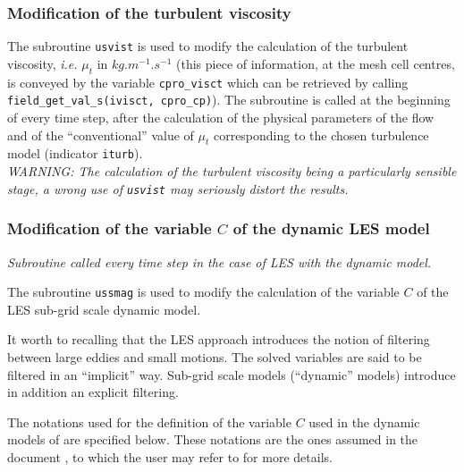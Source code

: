 {{{%
\subsubsection{Modification of the turbulent viscosity}

The subroutine \texttt{usvist} is used to modify the calculation of the turbulent
viscosity, {\em i.e.} $\mu_t$ in $kg.m^{-1}.s^{-1}$
(this piece of information, at the mesh cell centres, is conveyed by the
variable \texttt{cpro\_visct}  which can be retrieved by calling
\texttt{field\_get\_val\_s(ivisct, cpro\_cp)}). The
subroutine is called at the beginning of every time step, after the
calculation of the physical parameters of the flow and of the
``conventional'' value of $\mu_t$ corresponding to the chosen turbulence
model (indicator \texttt{iturb}).\\
{\em WARNING: The calculation of the turbulent viscosity being a
particularly sensible stage, a wrong use of {\em\texttt{usvist}} may
seriously distort the results.}

\subsubsection{Modification of the variable $C$ of the dynamic LES model}

\noindent
\textit{Subroutine called every time step in the case of LES with the
dynamic model.}

The subroutine \texttt{ussmag} is used to modify the calculation of the variable $C$ of
the LES sub-grid scale dynamic model.

It worth to recalling that the LES approach introduces the notion of
filtering between large eddies and small motions. The solved variables
are said to be filtered in an ``implicit'' way. Sub-grid scale models
(``dynamic'' models) introduce in addition an explicit filtering.

The notations used for the definition of the variable $C$ used in the
dynamic models of \CS are specified below. These notations are the ones
assumed in the document \cite{benhamadouche01}, to which the user may
refer to for more details.

}}}
